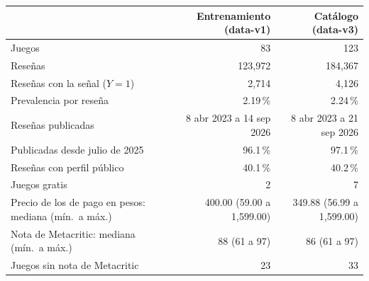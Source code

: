 \begin{tabularx}{\textwidth}{>{\raggedright\arraybackslash}X rr}
\toprule
 & Entrenamiento (data-v1) & Catálogo (data-v3) \\
\midrule
Juegos & 83 & 123 \\
Reseñas & 123,972 & 184,367 \\
Reseñas con la señal ($Y = 1$) & 2,714 & 4,126 \\
Prevalencia por reseña & 2.19\,\% & 2.24\,\% \\
Reseñas publicadas & 8 abr 2023 a 14 sep 2026 & 8 abr 2023 a 21 sep 2026 \\
Publicadas desde julio de 2025 & 96.1\,\% & 97.1\,\% \\
Reseñas con perfil público & 40.1\,\% & 40.2\,\% \\
Juegos gratis & 2 & 7 \\
Precio de los de pago en pesos: mediana (mín.\ a máx.) & 400.00 (59.00 a 1,599.00) & 349.88 (56.99 a 1,599.00) \\
Nota de Metacritic: mediana (mín.\ a máx.) & 88 (61 a 97) & 86 (61 a 97) \\
Juegos sin nota de Metacritic & 23 & 33 \\
\bottomrule
\end{tabularx}
